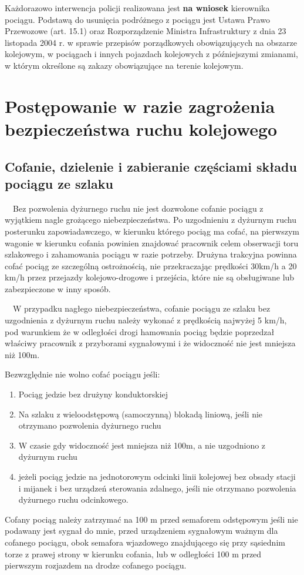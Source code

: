 Każdorazowo interwencja policji realizowana jest \textbf{na wniosek} kierownika pociągu. Podstawą do usunięcia podróżnego z pociągu jest Ustawa Prawo Przewozowe (art. 15.1) oraz Rozporządzenie Ministra Infrastruktury z dnia 23 listopada 2004 r. w sprawie przepisów porządkowych obowiązujących na obszarze kolejowym, w pociągach i innych pojazdach kolejowych z późniejszymi zmianami, w którym określone są zakazy obowiązujące na terenie kolejowym. 


\chapter{Postępowanie w razie zagrożenia bezpieczeństwa ruchu kolejowego}

\section{Cofanie, dzielenie i zabieranie częściami składu pociągu ze szlaku}

\ \ Bez pozwolenia dyżurnego ruchu nie jest dozwolone cofanie pociągu z wyjątkiem nagle grożącego niebezpieczeństwa. Po
uzgodnieniu z dyżurnym ruchu posterunku zapowiadawczego, w kierunku którego pociąg ma cofać, na pierwszym wagonie w
kierunku cofania powinien znajdować pracownik celem obserwacji toru szlakowego i zahamowania pociągu w razie potrzeby.
Drużyna trakcyjna powinna cofać pociąg ze szczególną ostrożnością, nie przekraczając prędkości 30km/h a 20 km/h przez
przejazdy kolejowo-drogowe i przejścia, które nie są obsługiwane lub zabezpieczone w inny sposób.

\ \ W przypadku nagłego niebezpieczeństwa, cofanie pociągu ze szlaku bez uzgodnienia z dyżurnym ruchu należy wykonać z
prędkością najwyżej 5 km/h, pod warunkiem że w odległości drogi hamowania pociąg będzie poprzedzał właściwy pracownik z
przyborami sygnałowymi i że widoczność nie jest mniejsza niż 100m.

Bezwzględnie nie wolno cofać pociągu jeśli:

\begin{enumerate}
\item Pociąg jedzie bez drużyny konduktorskiej
\item Na szlaku z wieloodstępową (samoczynną) blokadą liniową, jeśli nie otrzymano pozwolenia dyżurnego ruchu
\item W czasie gdy widoczność jest mniejsza niż 100m, a nie uzgodniono z dyżurnym ruchu
\item jeżeli pociąg jedzie na jednotorowym odcinki linii kolejowej bez obsady stacji i mijanek i bez urządzeń sterowania
zdalnego, jeśli nie otrzymano pozwolenia dyżurnego ruchu odcinkowego.
\end{enumerate}
Cofany pociąg należy zatrzymać na 100 m przed semaforem odstępowym jeśli nie podawany jest sygnał do mnie, przed
urządzeniem sygnałowym ważnym dla cofanego pociągu, obok semafora wjazdowego znajdującego się przy sąsiednim torze z
prawej strony w kierunku cofania, lub w odległości 100 m przed pierwszym rozjazdem na drodze cofanego pociągu.

